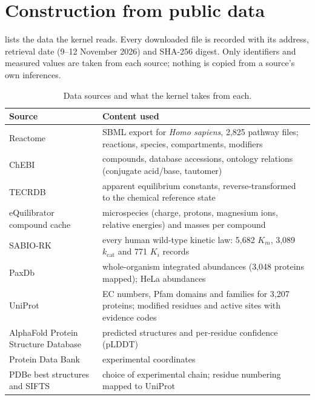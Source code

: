 \section{Construction from public data}
\label{sec:construction}

 lists the data the kernel reads.
Every downloaded file is recorded with its address, retrieval date (9--12 November 2026) and SHA-256 digest.
Only identifiers and measured values are taken from each source; nothing is copied from a source's own inferences.

\begin{table}[t]
\centering
\caption{Data sources and what the kernel takes from each.}
\label{tab:sources}
\small
\begin{tabularx}{\linewidth}{@{}l>{\raggedright\arraybackslash}X@{}}
\toprule
Source & Content used \\
\midrule
Reactome \citep{gillespie2022reactome} & SBML export for \textit{Homo sapiens}, 2{,}825 pathway files; reactions, species, compartments, modifiers \\
ChEBI \citep{hastings2016chebi} & compounds, database accessions, ontology relations (conjugate acid/base, tautomer) \\
TECRDB \citep{goldberg2004tecrdb} & apparent equilibrium constants, reverse-transformed to the chemical reference state \\
eQuilibrator compound cache \citep{beber2022equilibrator} & microspecies (charge, protons, magnesium ions, relative energies) and masses per compound \\
SABIO-RK \citep{wittig2012sabio} & every human wild-type kinetic law: 5{,}682 $K_m$, 3{,}089 $k_{\mathrm{cat}}$ and 771 $K_i$ records \\
PaxDb \citep{wang2015paxdb,nagaraj2011hela} & whole-organism integrated abundances (3{,}048 proteins mapped); HeLa abundances \\
UniProt \citep{uniprot2023} & EC numbers, Pfam domains and families for 3{,}207 proteins; modified residues and active sites with evidence codes \\
AlphaFold Protein Structure Database \citep{varadi2022afdb} & predicted structures and per-residue confidence (pLDDT) \\
Protein Data Bank \citep{berman2000pdb} & experimental coordinates \\
PDBe best structures and SIFTS \citep{velankar2013sifts} & choice of experimental chain; residue numbering mapped to UniProt \\

\end{tabularx}
\end{table}
